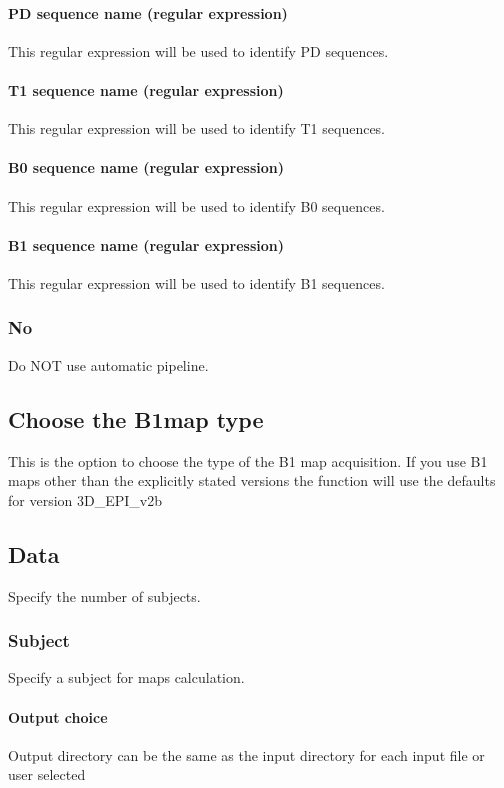 \paragraph{PD sequence name (regular expression)}
This regular expression will be used to identify PD sequences.


\paragraph{T1 sequence name (regular expression)}
This regular expression will be used to identify T1 sequences.


\paragraph{B0 sequence name (regular expression)}
This regular expression will be used to identify B0 sequences.


\paragraph{B1 sequence name (regular expression)}
This regular expression will be used to identify B1 sequences.


\subsubsection{No}
Do NOT use automatic pipeline.


\subsection{Choose the B1map type}
This is the option to choose the type of the B1 map acquisition. If you use B1 maps other than the explicitly stated versions the function will use the defaults for version 3D\_EPI\_v2b


\subsection{Data}
Specify the number of subjects.


\subsubsection{Subject}
Specify a subject for maps calculation.


\paragraph{Output choice}
Output directory can be the same as the input directory for each input file or user selected


